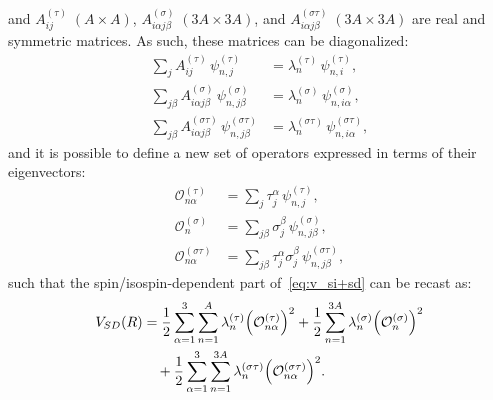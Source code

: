 \documentclass[aps,prc,twocolumn,superscriptaddress,floatfix]{revtex4-1}
\begin{document}
and $A^{(\tau)}_{ij}\;(A\times A)$, $A^{(\sigma)}_{i\alpha j\beta}\;(3A\times 3A)$, 
and $A^{(\sigma\tau)}_{i\alpha j\beta}\;(3A\times 3A)$
are real and symmetric matrices.
As such, these matrices can be diagonalized:
\begin{align}
\sum_{j}A^{(\tau)}_{ij}\,\psi_{n,j}^{(\tau)}&=\lambda_n^{(\tau)}\,\psi_{n,i}^{(\tau)} , \nonumber \\
\sum_{j\beta}A^{(\sigma)}_{i\alpha j\beta}\,\psi_{n,j\beta}^{(\sigma)}&=\lambda_n^{(\sigma)}\,\psi_{n,i\alpha}^{(\sigma)} , \nonumber \\
\sum_{j\beta}A^{(\sigma\tau)}_{i\alpha j\beta}\,\psi_{n,j\beta}^{(\sigma\tau)}&=\lambda_n^{(\sigma\tau)}\,\psi_{n,i\alpha}^{(\sigma\tau)} ,
\end{align}
and it is possible to define a new set of operators expressed in terms of their eigenvectors: 
\begin{align}
\mathcal O_{n\alpha}^{(\tau)}&=\sum_{j}\tau_j^\alpha\,\psi_{n,j}^{(\tau)} , \nonumber \\
\mathcal O_{n}^{(\sigma)}&=\sum_{j\beta}\sigma_j^\beta\,\psi_{n,j\beta}^{(\sigma)} , \nonumber \\
\mathcal O_{n\alpha}^{(\sigma\tau)}&=\sum_{j\beta}\tau_j^\alpha\sigma_j^\beta\,\psi_{n,j\beta}^{(\sigma\tau)} ,  
\end{align}
such that the spin/isospin-dependent part of~\cref{eq:v_si+sd} can be recast as:
\begin{align}
V_{SD}(R)&= 
 {1\over2}\sum_{\alpha=1}^3\sum_{n=1}^{A} \lambda_n^{(\tau)}\Big(\mathcal O_{n\alpha}^{(\tau)}\Big)^2
+{1\over2}\sum_{n=1}^{3A} \lambda_n^{(\sigma)}\Big(\mathcal O_n^{(\sigma)}\Big)^2 \nonumber \\
&\quad+{1\over2}\sum_{\alpha=1}^3\sum_{n=1}^{3A} \lambda_n^{(\sigma\tau)}\Big(\mathcal O_{n\alpha}^{(\sigma\tau)}\Big)^2 .
\end{align}
\end{document}
